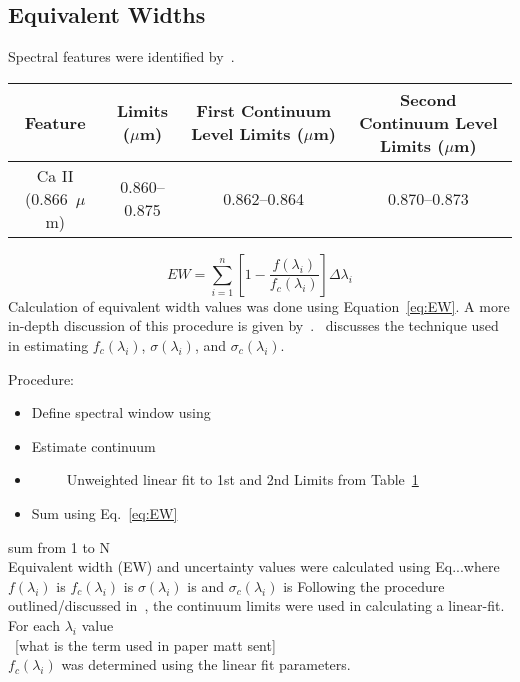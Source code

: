 \subsection{Equivalent Widths}


Spectral features were identified by~\cite{Rayner_2009}.  

\begin{table}[H]
	\begin{tabular}{c|c|c|c}
	\label{tab:features}
		Feature & Limits ($\mu$m) & First Continuum Level Limits ($\mu$m) & Second Continuum Level Limits ($\mu$m) \\ \hline
		Ca II (0.866~$\mu$m) & 0.860--0.875 & 0.862--0.864 & 0.870--0.873 \\
	\end{tabular}
\end{table}

\begin{equation}\label{eq:EW}
	EW = \sum_{i=1}^{n} [1 - \frac{f(\lambda_{i})}{f_{c}(\lambda_{i})}] \Delta\lambda_{i}
\end{equation}
Calculation of equivalent width values was done using Equation~\ref{eq:EW}.  A more in-depth discussion of this procedure is given by~\cite{Cushing_2005}.  \cite{Sembach_1992}~discusses the technique used in estimating $f_{c}(\lambda_{i})$, $\sigma(\lambda_{i})$, and $\sigma_{c}(\lambda_{i})$.

Procedure:\\
\begin{itemize}
	\item{} Define spectral window using
	\item{} Estimate continuum
	\item{}~~~~~Unweighted linear fit to 1st and 2nd Limits from Table~\ref{tab:features}
	\item{} Sum using Eq.~\ref{eq:EW}
\end{itemize}

sum from 1 to N\\

Equivalent width (EW) and uncertainty values were calculated using Eq...where $f(\lambda_{i})$ is
$f_{c}(\lambda_{i})$ is
$\sigma(\lambda_{i})$ is
and $\sigma_{c}(\lambda_{i})$ is
Following the procedure outlined/discussed in~\cite{Cushing_2005}, the continuum limits were used in calculating a linear-fit.  For each $\lambda_{i}$ value\\
~[what is the term used in paper matt sent]\\
$f_{c}(\lambda_{i})$ was determined using the linear fit parameters.

